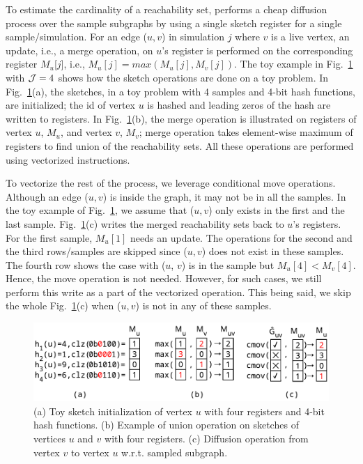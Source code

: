 \documentclass[final,5p,times,twocolumn]{elsarticle}
\newcommand\acro{{\sc{HyperFuseR\xspace}\xspace}\xspace}
\newcommand\kktodo[1]{\textcolor{red}{#1}}
\newcommand\ggx[1]{\textcolor{blue}{#1}}
\begin{document}
To estimate the cardinality of a reachability set, \acro{} performs a cheap diffusion process over the sample subgraphs by using a single sketch register for a single sample/simulation. 
For an edge ($u, v$) in simulation $j$ where $v$ is a live vertex, an update, i.e., a merge operation, on $u$'s register is performed on the corresponding register $M_u$[$j$], i.e., $M_u[j] = max(M_u[j],M_v[j])$. 
The toy example in Fig.~\ref{fig:fmops} with  ${\cal J} = 4$ shows how the sketch operations are done on a toy problem. In Fig.~\ref{fig:fmops}(a), the sketches, in a toy problem with 4 samples and 4-bit hash functions, are initialized; the id of vertex $u$ is hashed and leading zeros of the hash are written to registers. In Fig.~\ref{fig:fmops}(b), the merge operation is illustrated on registers of vertex $u$, $M_u$, and vertex $v$, $M_v$; merge operation takes element-wise maximum of registers to find union of the reachability sets. All these operations are performed using vectorized instructions. 

 To vectorize the rest of the process, we leverage conditional move operations. Although an edge ($u, v$) is inside the graph, it may not be in all the samples. In the toy example of Fig.~\ref{fig:fmops}, we assume that ($u, v$) only exists in the first and the last sample. 
 Fig.~\ref{fig:fmops}(c) writes the merged reachability sets back to $u$'s registers. For the first sample, $M_u[1]$ needs an update. The operations for the second and the third rows/samples are skipped since ($u, v$) does not exist in these samples. The fourth row shows the case with ($u$, $v$) is in the sample but $M_u[4] < M_v[4]$. Hence, the move operation is not needed. However, for such cases, we still perform this write as a part of the vectorized operation. This being said, we skip the whole Fig.~\ref{fig:fmops}(c) when ($u, v$) is not in any of these samples.   


\begin{figure}[!ht]
    \begin{center}
    \includegraphics[width=0.8\linewidth]{images/fmops.pdf}
    \caption{ (a) \label{fminit} Toy sketch initialization of vertex $u$ with four registers and 4-bit hash functions. (b) \label{fmmerge} Example of union operation on sketches of vertices $u$ and $v$ with four registers. (c) \label{fmwrite} Diffusion operation from vertex $v$ to vertex $u$ w.r.t. sampled subgraph. 
     }\label{fig:fmops} 
    \end{center}
\end{figure}
\end{document}
